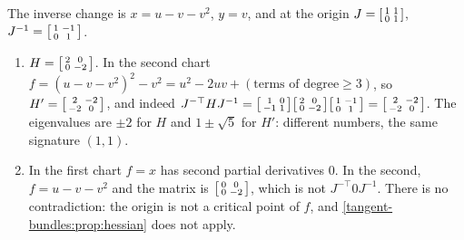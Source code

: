 The inverse change is $x = u - v - v^2$, $y = v$, and at the origin
$J = \begin{bsmallmatrix}1 & 1\\ 0 & 1\end{bsmallmatrix}$,
$J^{-1} = \begin{bsmallmatrix}1 & -1\\ 0 & 1\end{bsmallmatrix}$.
\begin{enumerate}[nosep]
  \item $H = \begin{bsmallmatrix}2 & 0\\ 0 & -2\end{bsmallmatrix}$. In
        the second chart $f = (u - v - v^2)^2 - v^2 = u^2 - 2uv
        + (\text{terms of degree}\geq3)$, so
        $H' = \begin{bsmallmatrix}2 & -2\\ -2 & 0\end{bsmallmatrix}$, and
        indeed
        $J^{-\top}HJ^{-1}
        = \begin{bsmallmatrix}1 & 0\\ -1 & 1\end{bsmallmatrix}
        \begin{bsmallmatrix}2 & 0\\ 0 & -2\end{bsmallmatrix}
        \begin{bsmallmatrix}1 & -1\\ 0 & 1\end{bsmallmatrix}
        = \begin{bsmallmatrix}2 & -2\\ -2 & 0\end{bsmallmatrix}$. The
        eigenvalues are $\pm2$ for $H$ and $1\pm\sqrt5$ for $H'$:
        different numbers, the same signature $(1, 1)$.
  \item In the first chart $f = x$ has second partial derivatives $0$.
        In the second, $f = u - v - v^2$ and the matrix is
        $\begin{bsmallmatrix}0 & 0\\ 0 & -2\end{bsmallmatrix}$, which is
        not $J^{-\top}0J^{-1}$. There is no contradiction: the origin is
        not a critical point of $f$, and
        \cref{tangent-bundles:prop:hessian} does not apply.
\end{enumerate}

